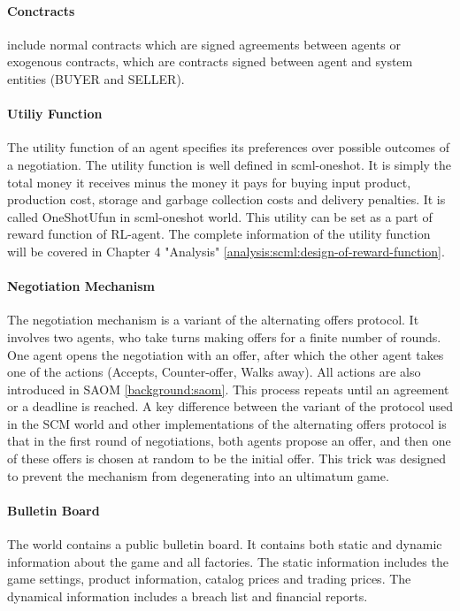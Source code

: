 \paragraph{Conctracts} include normal contracts which are signed agreements between agents or exogenous contracts, which are contracts signed between agent and system entities (BUYER and SELLER).
\paragraph{Utiliy Function} The utility function of an agent specifies its preferences over possible outcomes of a negotiation. The utility function is well defined in \gls{scml-oneshot}. It is simply the total money it receives minus the money it pays for buying input product, production cost, storage and garbage collection costs and delivery penalties. It is called OneShotUfun in \gls{scml-oneshot} world. This utility can be set as a part of reward function of RL-agent. The complete information of the utility function will be covered in Chapter 4 "Analysis" \ref{analysis:scml:design-of-reward-function}.
\paragraph{Negotiation Mechanism} The negotiation mechanism is a variant of the alternating offers protocol. It involves two agents, who take turns making offers for a finite number of rounds. One agent opens the negotiation with an offer, after which the other agent takes one of the actions (Accepts, Counter-offer, Walks away). All actions are also introduced in SAOM \ref{background:saom}. This process repeats until an agreement or a deadline is reached. A key difference between the variant of the protocol used in the SCM world and other implementations of the alternating offers protocol is that in the first round of negotiations, both agents propose an offer, and then one of these offers is chosen at random to be the initial offer. This trick was designed to prevent the mechanism from degenerating into an ultimatum game.
\paragraph{Bulletin Board} The world contains a public bulletin board. It contains both static and dynamic information about the game and all factories. The static information includes the game settings, product information, catalog prices and trading prices. The dynamical information includes a breach list and financial reports.
